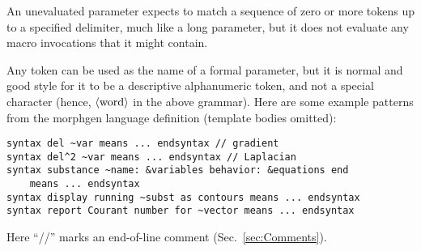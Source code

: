 \documentclass[12pt]{article}
\begin{document}
An unevaluated parameter expects to match a sequence of zero or more tokens up to a specified delimiter, much like a long parameter, but it does not evaluate any macro invocations that it might contain.

Any token can be used as the name of a formal parameter, but it is normal and good style for it to be a descriptive alphanumeric token, and not a special character (hence, $\langle\mbox{word}\rangle$ in the above grammar).
Here are some example patterns from the morphgen language definition \cite{CF2D-TR} (template bodies omitted):
\begin{lstlisting}[frame=single]
syntax del ~var means ... endsyntax // gradient
syntax del^2 ~var means ... endsyntax // Laplacian
syntax substance ~name: &variables behavior: &equations end
    means ... endsyntax
syntax display running ~subst as contours means ... endsyntax
syntax report Courant number for ~vector means ... endsyntax
\end{lstlisting}
Here ``//'' marks an end-of-line comment (Sec.\ \ref{sec:Comments}).
\end{document}
